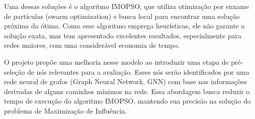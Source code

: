 \documentclass[12pt]{article}
\begin{document}
Uma dessas soluções é o algoritmo IMOPSO, que utiliza otimização por enxame de partículas (swarm optimization) e busca local para encontrar uma solução próxima da ótima. Como esse algoritmo emprega heurísticas, ele não garante a solução exata, mas tem apresentado excelentes resultados, especialmente para redes maiores, com uma considerável economia de tempo.

O projeto propõe uma melhoria nesse modelo ao introduzir uma etapa de pré-seleção de nós relevantes para a avaliação. Esses nós serão identificados por uma rede neural de grafos (Graph Neural Network, GNN) com base nas informações derivadas de alguns caminhos mínimos na rede. Essa abordagem busca reduzir o tempo de execução do algoritmo IMOPSO, mantendo sua precisão na solução do problema de Maximização de Influência.








\end{document}

